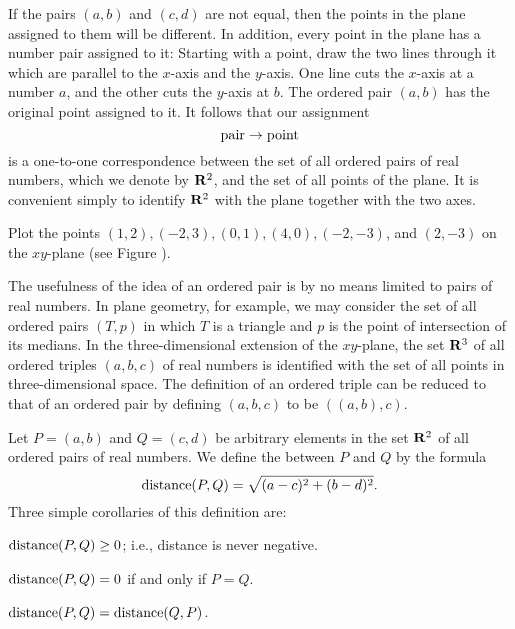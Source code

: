 If the pairs $(a, b)$ and $(c, d)$ are not equal,
then the points in the plane assigned to them will be different.
In addition, every point in the plane has a number pair assigned to it:
Starting with a point, draw the two lines through it
which are parallel to the $x$-axis and the $y$-axis.
One line cuts the $x$-axis at a number $a$,
and the other cuts the $y$-axis at $b$.
The ordered pair $(a, b)$ has the original point assigned to it.
It follows that our assignment
\[
\mbox{pair} \rightarrow \mbox{point}
\]
is a one-to-one correspondence
between the set of all ordered pairs of real numbers,
which we denote by $\mathrm{\bf R}^2$,
and the set of all points of the plane.
It is convenient simply to identify $\mathrm{\bf R}^2$ with the plane
together with the two axes.

\begin{example}
\label{exam 1.2.1}
Plot the points
$(1, 2), (-2, 3), (0, 1), (4, 0), (-2, -3)$, and $(2, -3)$
on the $xy$-plane
(see Figure ).
\end{example}


The usefulness of the idea of an ordered pair
is by no means limited to pairs of real numbers.
In plane geometry, for example,
we may consider the set of all ordered pairs $(T, p)$
in which $T$ is a triangle and $p$ is the point of intersection
of its medians.
In the three-dimensional extension of the $xy$-plane,
the set $\mathrm{\bf R}^3$ of all ordered triples $(a, b, c)$ of real numbers
is identified with the set of all points in three-dimensional space.
The definition of an ordered triple
can be reduced to that of an ordered pair
by defining $(a, b, c)$ to be $((a, b), c)$.


Let $P = (a, b)$ and $Q = (c, d)$
be arbitrary elements in the set
$\mathrm{\bf R}^2$ of all ordered pairs of real numbers.
We define the  between $P$ and $Q$ by the formula
\begin{equation}
\label{eq1.2.1}
\mathrm{distance}(P, Q) = \sqrt{(a - c)^2 + (b - d)^2}.     
\end{equation}
Three simple corollaries of this definition are:

\begin{prop}
\label{thm 1.2.1}
$\mathrm{distance}(P, Q) \geq 0$; i.e., distance is never negative.
\end{prop}
\begin{prop} %
\label{thm 1.2.2}
$\mathrm{distance}(P, Q) = 0$
if and only if $P = Q$. 
\end{prop}
\begin{prop} %
\label{thm 1.2.3}
$\mathrm{distance}(P, Q) = \mathrm{distance} (Q, P)$. 
\end{prop}

